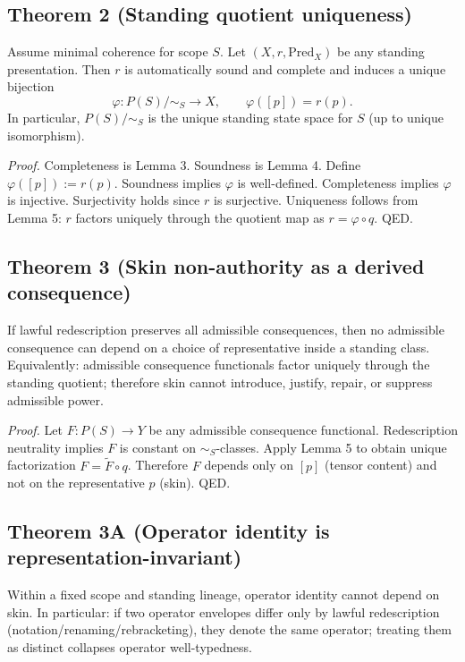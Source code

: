 \documentclass[12pt]{article}
\theoremstyle{plain}
\begin{document}
\subsection{Theorem 2 (Standing quotient uniqueness)}

Assume minimal coherence for scope $S$. Let $(X,r,\mathrm{Pred}_X)$ be any standing presentation. Then $r$ is automatically sound and complete and induces a unique bijection
\[
\varphi:P(S)/\sim_S\to X,\qquad \varphi([p])=r(p).
\]
In particular, $P(S)/\sim_S$ is the unique standing state space for $S$ (up to unique isomorphism).

\textit{Proof.} Completeness is Lemma 3. Soundness is Lemma 4. Define $\varphi([p]):=r(p)$. Soundness implies $\varphi$ is well-defined. Completeness implies $\varphi$ is injective. Surjectivity holds since $r$ is surjective. Uniqueness follows from Lemma 5: $r$ factors uniquely through the quotient map as $r=\varphi\circ q$. QED.

\subsection{Theorem 3 (Skin non-authority as a derived consequence)}

If lawful redescription preserves all admissible consequences, then no admissible consequence can depend on a choice of representative inside a standing class. Equivalently: admissible consequence functionals factor uniquely through the standing quotient; therefore skin cannot introduce, justify, repair, or suppress admissible power.

\textit{Proof.} Let $F:P(S)\to Y$ be any admissible consequence functional. Redescription neutrality implies $F$ is constant on $\sim_S$-classes. Apply Lemma 5 to obtain unique factorization $F=\widetilde F\circ q$. Therefore $F$ depends only on $[p]$ (tensor content) and not on the representative $p$ (skin). QED.


\subsection{Theorem 3A (Operator identity is representation-invariant)}

Within a fixed scope and standing lineage, operator identity cannot depend on skin. In particular: if two operator envelopes differ only by lawful redescription (notation/renaming/rebracketing), they denote the same operator; treating them as distinct collapses operator well-typedness.
\end{document}
